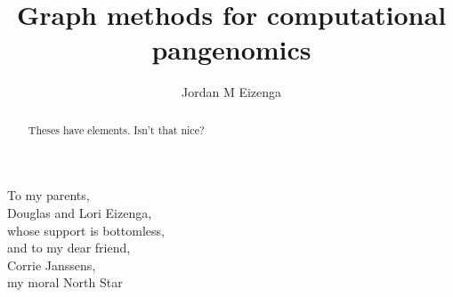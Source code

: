 \documentclass[11pt]{ucthesis}
\begin{document}

\title{Graph methods for computational pangenomics}
\author{Jordan M Eizenga}
\deanlinethree{}

\begin{frontmatter}

\maketitle
\copyrightpage

\tableofcontents
\listoffigures
\listoftables

\begin{abstract}
Theses have elements.  Isn't that nice?
\end{abstract}

\begin{dedication}
\null\vfil
{\large
\begin{center}
To my parents,\\%
Douglas and Lori Eizenga,\\%
whose support is bottomless, \\\vspace{48pt}
and to my dear friend, \\%
Corrie Janssens,\\%
my moral North Star
\end{center}}
\vfil\null
\end{dedication}


\begin{acknowledgements}
\end{acknowledgements}

\end{frontmatter}
\end{document}
